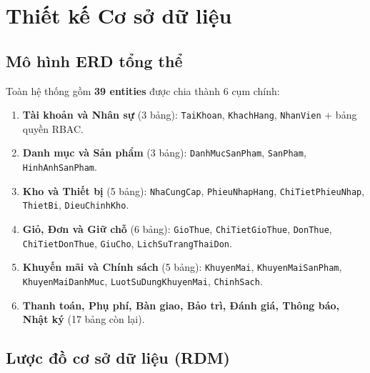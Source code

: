 \chapter{Thiết kế Cơ sở dữ liệu}
\label{chuong:co_so_du_lieu}

\section{Mô hình ERD tổng thể}
\label{sec:erd}


Toàn hệ thống gồm \textbf{39 entities} được chia thành 6 cụm chính:

\begin{enumerate}[leftmargin=2em]
  \item \textbf{Tài khoản và Nhân sự} (3 bảng): \texttt{TaiKhoan}, \texttt{KhachHang}, \texttt{NhanVien} + bảng quyền RBAC.
  \item \textbf{Danh mục và Sản phẩm} (3 bảng): \texttt{DanhMucSanPham}, \texttt{SanPham}, \texttt{HinhAnhSanPham}.
  \item \textbf{Kho và Thiết bị} (5 bảng): \texttt{NhaCungCap}, \texttt{PhieuNhapHang}, \texttt{ChiTietPhieuNhap}, \texttt{ThietBi}, \texttt{DieuChinhKho}.
  \item \textbf{Giỏ, Đơn và Giữ chỗ} (6 bảng): \texttt{GioThue}, \texttt{ChiTietGioThue}, \texttt{DonThue}, \texttt{ChiTietDonThue}, \texttt{GiuCho}, \texttt{LichSuTrangThaiDon}.
  \item \textbf{Khuyến mãi và Chính sách} (5 bảng): \texttt{KhuyenMai}, \texttt{KhuyenMaiSanPham}, \texttt{KhuyenMaiDanhMuc}, \texttt{LuotSuDungKhuyenMai}, \texttt{ChinhSach}.
  \item \textbf{Thanh toán, Phụ phí, Bàn giao, Bảo trì, Đánh giá, Thông báo, Nhật ký} (17 bảng còn lại).
\end{enumerate}

\section{Lược đồ cơ sở dữ liệu (RDM)}
\label{sec:rdm}

